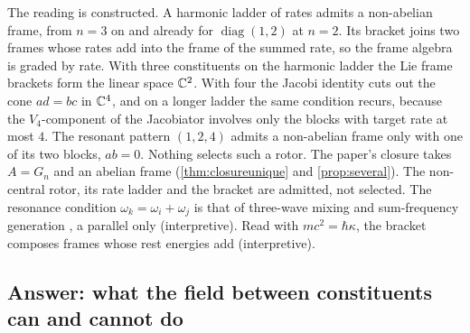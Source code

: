 The reading is constructed. A harmonic ladder of rates admits a non-abelian frame, from $n=3$ on and already for $\operatorname{diag}(1,2)$ at $n=2$. Its
bracket joins two frames whose rates add into the frame of the summed rate, so the frame algebra is graded by rate. With three constituents
on the harmonic ladder the Lie frame brackets form the linear space $\mathbb{C}^2$. With four the Jacobi identity cuts out the cone $ad=bc$ in $\mathbb{C}^4$, and
on a longer ladder the same condition recurs, because the $V_4$-component of the Jacobiator involves only the blocks with target rate at most
$4$. The resonant pattern $(1,2,4)$ admits a non-abelian frame only with one of its two blocks, $ab=0$. Nothing selects such a rotor. The paper's closure takes $A=G_n$ and an abelian frame
(\cref{thm:closureunique} and \cref{prop:several}). The non-central rotor, its rate ladder and the bracket are admitted, not selected. The
resonance condition $\omega_k=\omega_i+\omega_j$ is that of three-wave mixing and sum-frequency generation \cite{Armstrong62}, a parallel only
(interpretive). Read with $mc^2=\hbar\kappa$, the bracket composes frames whose rest energies add (interpretive).

\subsection{Answer: what the field between constituents can and cannot do}
\label{e4:sec:answer}

